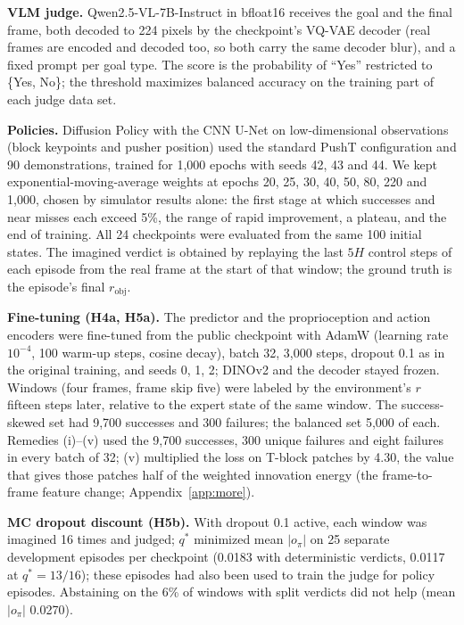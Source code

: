 \documentclass[10pt]{article}
\newcommand{\rob}{r_{\mathrm{obj}}}
\begin{document}
\textbf{VLM judge.} Qwen2.5-VL-7B-Instruct in bfloat16 receives the goal and the final frame, both decoded to 224 pixels by the checkpoint's VQ-VAE decoder (real frames are encoded and decoded too, so both carry the same decoder blur), and a fixed prompt per goal type. The score is the probability of ``Yes'' restricted to \{Yes, No\}; the threshold maximizes balanced accuracy on the training part of each judge data set.

\textbf{Policies.} Diffusion Policy with the CNN U-Net on low-dimensional observations (block keypoints and pusher position) used the standard PushT configuration and 90 demonstrations, trained for 1,000 epochs with seeds 42, 43 and 44. We kept exponential-moving-average weights at epochs 20, 25, 30, 40, 50, 80, 220 and 1,000, chosen by simulator results alone: the first stage at which successes and near misses each exceed 5\%, the range of rapid improvement, a plateau, and the end of training. All 24 checkpoints were evaluated from the same 100 initial states. The imagined verdict is obtained by replaying the last $5H$ control steps of each episode from the real frame at the start of that window; the ground truth is the episode's final $\rob$.

\textbf{Fine-tuning (H4a, H5a).} The predictor and the proprioception and action encoders were fine-tuned from the public checkpoint with AdamW (learning rate $10^{-4}$, 100 warm-up steps, cosine decay), batch 32, 3,000 steps, dropout 0.1 as in the original training, and seeds 0, 1, 2; DINOv2 and the decoder stayed frozen. Windows (four frames, frame skip five) were labeled by the environment's $r$ fifteen steps later, relative to the expert state of the same window. The success-skewed set had 9,700 successes and 300 failures; the balanced set 5,000 of each. Remedies (i)--(v) used the 9,700 successes, 300 unique failures and eight failures in every batch of 32; (v) multiplied the loss on T-block patches by 4.30, the value that gives those patches half of the weighted innovation energy (the frame-to-frame feature change; Appendix~\ref{app:more}).

\textbf{MC dropout discount (H5b).} With dropout 0.1 active, each window was imagined 16 times and judged; $q^*$ minimized mean $|o_\pi|$ on 25 separate development episodes per checkpoint (0.0183 with deterministic verdicts, 0.0117 at $q^*=13/16$); these episodes had also been used to train the judge for policy episodes. Abstaining on the 6\% of windows with split verdicts did not help (mean $|o_\pi|$ 0.0270).
\end{document}
